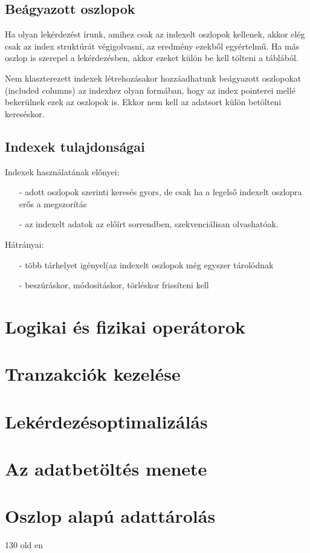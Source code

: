 \documentclass[12pt]{article}
\theoremstyle{plain}
\begin{document}
\subsection{Beágyazott oszlopok}

Ha olyan lekérdezést írunk, amihez csak az indexelt oszlopok kellenek, akkor elég csak az index struktúrát végigolvasni, az eredmény ezekből egyértelmű. Ha más oszlop is szerepel a lekérdezésben, akkor ezeket külön be kell tölteni a táblából.\par
Nem klaszterezett indexek létrehozásakor hozzáadhatunk beágyazott oszlopokat (included columns) az indexhez olyan formában, hogy az index pointerei mellé bekerülnek ezek az oszlopok is. Ekkor nem kell az adatsort külön betölteni kereséskor.

\subsection{Indexek tulajdonságai}

Indexek használatának előnyei:
\begin{itemize}
    \item[-]adott oszlopok szerinti keresés gyors, de csak ha a legelső indexelt oszlopra erős a megszorítás
    \item[-]az indexelt adatok az előírt sorrendben, szekvenciálisan olvashatóak.
\end{itemize}{}
Hátrányai:
\begin{itemize}
    \item[-]több tárhelyet igényel(az indexelt oszlopok még egyszer tárolódnak
    \item[-]beszúráskor, módosításkor, törléskor frissíteni kell
\end{itemize}{}








\section{Logikai és fizikai operátorok}
\section{Tranzakciók kezelése}
\section{Lekérdezésoptimalizálás}
\section{Az adatbetöltés menete}
\section{Oszlop alapú adattárolás}
130 old en




\end{document}
